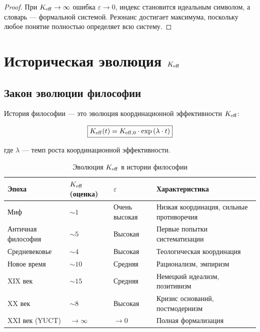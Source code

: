 \documentclass[12pt,a4paper]{article}
\newcommand{\eps}{\varepsilon}
\begin{document}
	\begin{proof}
		При \(\Keff \to \infty\) ошибка \(\eps \to 0\), индекс становится идеальным символом, а словарь — формальной системой. Резонанс достигает максимума, поскольку любое понятие полностью определяет всю систему.
	\end{proof}
	
	\section{Историческая эволюция \texorpdfstring{\(\Keff\)}{K\_eff}}
	
	\subsection{Закон эволюции философии}
	
	История философии — это эволюция координационной эффективности \(\Keff\):
	
	\begin{equation}
		\boxed{
			\Keff(t) = \Keff[0] \cdot \exp\left(\lambda \cdot t\right)
		}
	\end{equation}
	
	где \(\lambda\) — темп роста координационной эффективности.
	
	\begin{table}[H]
		\centering
		\caption{Эволюция \(\Keff\) в истории философии}
		\begin{tabular}{p{3cm}p{3cm}p{3cm}p{4cm}}
			\toprule
			\textbf{Эпоха} & \(\Keff\) (оценка) & \(\eps\) & \textbf{Характеристика} \\
			\midrule
			Миф & \(\sim 1\) & Очень высокая & Низкая координация, сильные противоречия \\
			Античная философия & \(\sim 5\) & Высокая & Первые попытки систематизации \\
			Средневековье & \(\sim 4\) & Высокая & Теологическая координация \\
			Новое время & \(\sim 10\) & Средняя & Рационализм, эмпиризм \\
			XIX век & \(\sim 15\) & Средняя & Немецкий идеализм, позитивизм \\
			XX век & \(\sim 8\) & Высокая & Кризис оснований, постмодернизм \\
			XXI век (YUCT) & \(\to \infty\) & \(\to 0\) & Полная формализация \\
			\bottomrule
		\end{tabular}
	\end{table}
	
\end{document}

